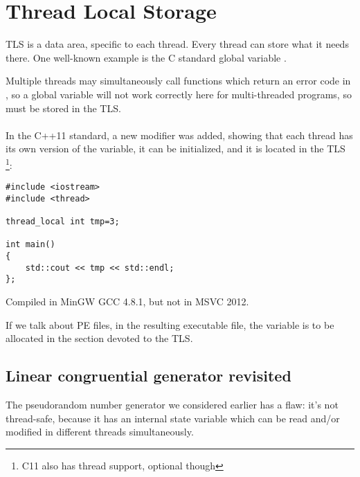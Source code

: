 \chapter{Thread Local Storage}
\label{TLS}

TLS is a data area, specific to each thread. Every thread can store what it needs there.
One well-known example is the C standard global variable . 

Multiple threads may simultaneously call functions
which return an error code in , so a global variable will not work correctly here for multi-threaded programs,
so  must be stored in the \ac{TLS}. \\
\\
In the C++11 standard, a new  modifier was added, showing that each thread has its own version of the variable,
it can be initialized, and it is located in the \ac{TLS}
\footnote{ C11 also has thread support, optional though}:

\begin{lstlisting}[caption=C++11]
#include <iostream>
#include <thread>

thread_local int tmp=3;

int main()
{
	std::cout << tmp << std::endl;
};
\end{lstlisting}

Compiled in MinGW GCC 4.8.1, but not in MSVC 2012.

If we talk about PE files, in the resulting executable file, the  
variable is to be allocated in the section devoted to the \ac{TLS}.

\section{Linear congruential generator revisited}
\label{LCG_TLS}

The pseudorandom number generator we considered earlier  has a flaw:
it's not thread-safe, because it has an internal state variable which can be read and/or modified in different threads simultaneously.




